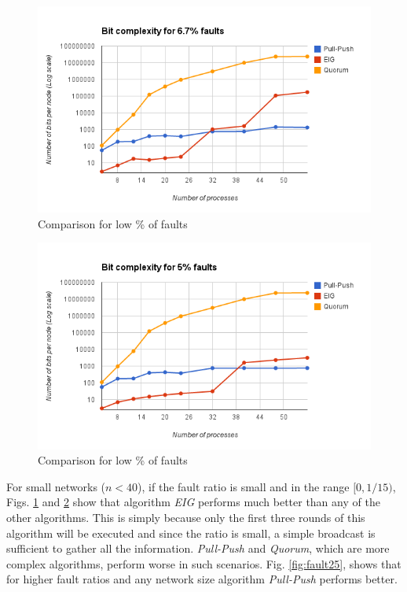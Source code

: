 \begin{figure}[ht]
 \centering
\includegraphics[scale=0.4]{Fault667}
\caption{Comparison for low \% of faults}
 \label{fig:fault667}
\vspace{-2mm}
\end{figure}

\begin{figure}[ht]
 \centering
\includegraphics[scale=0.4]{Fault5}
\caption{Comparison for low \% of faults}
 \label{fig:fault5}
\vspace{-2mm}
\end{figure}

For small networks ($n < 40$), if the fault ratio is small and in the range $[0, 1/15)$, Figs. \ref{fig:fault667} and \ref{fig:fault5} show that algorithm \textit{EIG} performs much better than any of the other algorithms. This is simply because only the first three rounds of this algorithm will be executed and since the ratio is small, a simple broadcast is sufficient to gather all the information. \textit{Pull-Push} and \textit{Quorum}, which are more complex algorithms, perform worse in such scenarios. Fig. \ref{fig:fault25}, shows that for higher fault ratios and any network size algorithm \textit{Pull-Push} performs better.

